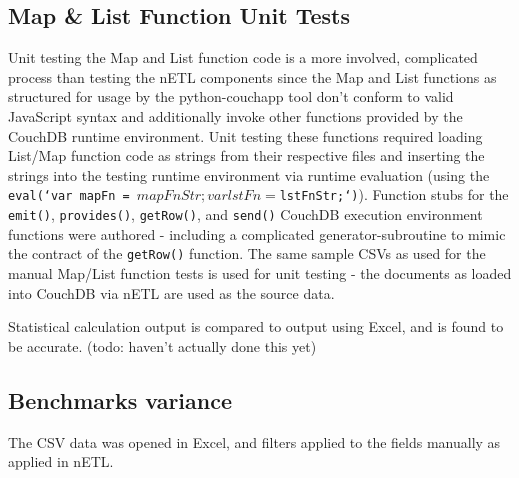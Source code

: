 \subsection{Map \& List Function Unit Tests}
Unit testing the Map and List function code is a more involved, complicated process than testing the nETL components since the Map and List functions as structured for usage by the python-couchapp tool don't conform to valid JavaScript syntax and additionally invoke other functions provided by the CouchDB runtime environment. Unit testing these functions required loading List/Map function code as strings from their respective files and inserting the strings into the testing runtime environment via runtime evaluation (using the \texttt{eval(`var mapFn = ${mapFnStr}; var lstFn = ${lstFnStr};`)}). Function stubs for the \texttt{emit()}, \texttt{provides()}, \texttt{getRow()}, and \texttt{send()} CouchDB execution environment functions were authored - including a complicated generator-subroutine to mimic the contract of the \texttt{getRow()} function. The same sample CSVs as used for the manual Map/List function tests is used for unit testing - the documents as loaded into CouchDB via nETL are used as the source data.

Statistical calculation output is compared to output using Excel, and is found to be accurate. (todo: haven't actually done this yet)


\subsection{Benchmarks variance}
The CSV data was opened in Excel, and filters applied to the fields manually as applied in nETL.